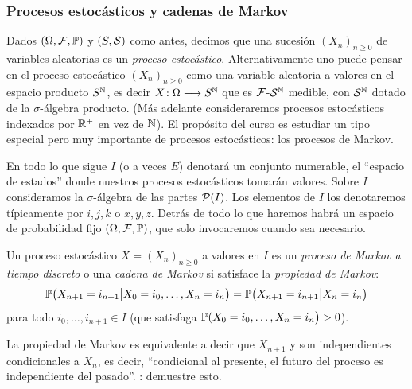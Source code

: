 \subsubsection{Procesos estocásticos y cadenas de Markov}

Dados $(\Omega,\mathcal{F},\mathbb{P})$ y $(S,\mathcal{S})$ como antes, decimos que una sucesión $(X_n)_{n\geq0}$ de variables aleatorias es un \emph{proceso estocástico}.
Alternativamente uno puede pensar en el proceso estocástico $(X_n)_{n\geq0}$ como una variable aleatoria a valores en el espacio producto $S^{\mathbb{N}}$, es decir $X\!:\Omega\longrightarrow S^{\mathbb{N}}$ que es $\mathcal{F}$-$\mathcal{S}^{\mathbb{N}}$ medible, con $\mathcal{S}^{\mathbb{N}}$ dotado de la $\sigma$-álgebra producto.
\lsep
(Más adelante consideraremos procesos estocásticos indexados por $\mathbb{R}^+$ en vez de $\mathbb{N}$).
\lsep
El propósito del curso es estudiar un tipo especial pero muy importante de procesos estocásticos: los procesos de Markov.

\vs

En todo lo que sigue $I$ (o a veces $E$) denotará un conjunto numerable, el ``espacio de estados'' donde nuestros procesos estocásticos tomarán valores.
Sobre $I$ consideramos la $\sigma$-álgebra de las partes $\mathcal{P}(I)$.
Los elementos de $I$ los denotaremos típicamente por $i,j,k$ o $x,y,z$.
Detrás de todo lo que haremos habrá un espacio de probabilidad fijo $(\Omega,\mathcal{F},\mathbb{P})$, que solo invocaremos cuando sea necesario.

\begin{defn}
Un proceso estocástico $X=(X_n)_{n\geq0}$ a valores en $I$ es un \emph{proceso de Markov a tiempo discreto} o una \emph{cadena de Markov} si satisface la \emph{propiedad de Markov}:
\begin{equation}\label{eq:propMarkov}
\mathbb{P}\big(X_{n+1}=i_{n+1}\big|X_0=i_0,\dotsc,X_{n}=i_{n}\big)=\mathbb{P}\big(X_{n+1}=i_{n+1}\big|X_{n}=i_{n}\big)
\end{equation}
para todo $i_0,\dotsc,i_{n+1}\in I$ (que satisfaga $\mathbb{P}(X_0=i_0,\dotsc,X_{n}=i_{n}\big)>0$).
\end{defn}

\begin{rem}
La propiedad de Markov es equivalente a decir que $X_{n+1}$ y  son independientes condicionales a $X_n$, es decir, ``condicional al presente, el futuro del proceso es independiente del pasado''.
\uexer: demuestre esto.
\end{rem}


